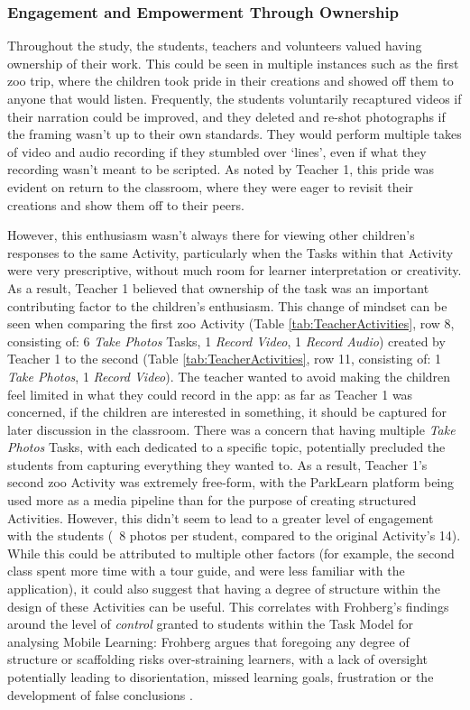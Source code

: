 \subsubsection{Engagement and Empowerment Through Ownership} 

Throughout the study, the students, teachers and volunteers valued having ownership of their work. This could be seen in multiple instances such as the first zoo trip, where the children took pride in their creations and showed off them to anyone that would listen. Frequently, the students voluntarily recaptured videos if their narration could be improved, and they deleted and re-shot photographs if the framing wasn't up to their own standards. They would perform multiple takes of video and audio recording if they stumbled over `lines', even if what they recording wasn't meant to be scripted. As noted by Teacher 1, this pride was evident on return to the classroom, where they were eager to revisit their creations and show them off to their peers. 

However, this enthusiasm wasn't always there for viewing other children’s responses to the same Activity, particularly when the Tasks within that Activity were very prescriptive, without much room for learner interpretation or creativity. As a result, Teacher 1 believed that ownership of the task was an important contributing factor to the children’s enthusiasm. This change of mindset can be seen when comparing the first zoo Activity (Table \ref{tab:TeacherActivities}, row 8, consisting of: 6 \textit{Take Photos} Tasks, 1 \textit{Record Video}, 1 \textit{Record Audio}) created by Teacher 1 to the second (Table \ref{tab:TeacherActivities}, row 11, consisting of: 1 \textit{Take Photos}, 1 \textit{Record Video}). The teacher wanted to avoid making the children feel limited in what they could record in the app: as far as Teacher 1 was concerned, if the children are interested in something, it should be captured for later discussion in the classroom. There was a concern that having multiple \textit{Take Photos} Tasks, with each dedicated to a specific topic, potentially precluded the students from capturing everything they wanted to. As a result, Teacher 1's second zoo Activity was extremely free-form, with the ParkLearn platform being used more as a media pipeline than for the purpose of creating structured Activities. However, this didn't seem to lead to a greater level of engagement with the students (~8 photos per student, compared to the original Activity's 14). While this could be attributed to multiple other factors (for example, the second class spent more time with a tour guide, and were less familiar with the application), it could also suggest that having a degree of structure within the design of these Activities can be useful. This correlates with Frohberg's findings around the level of \textit{control} granted to students within the Task Model for analysing Mobile Learning: Frohberg argues that foregoing any degree of structure or scaffolding risks over-straining learners, with a lack of oversight potentially leading to disorientation, missed learning goals, frustration or the development of false conclusions \citep{Frohberg2009}.


